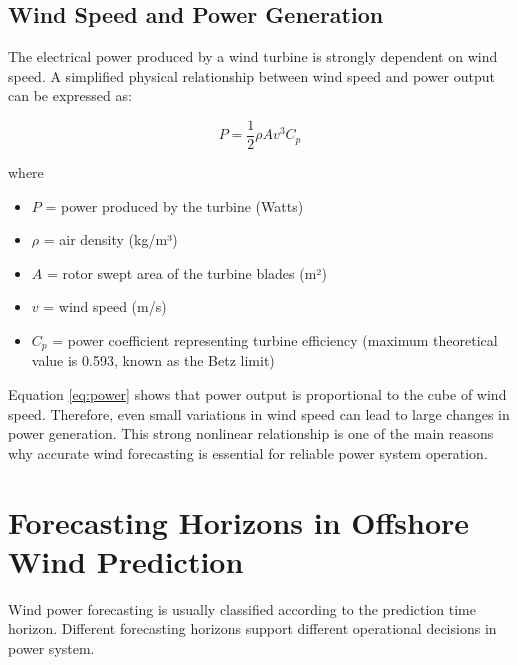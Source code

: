 \documentclass[12pt,a4paper]{article}
\begin{document}
\subsection{Wind Speed and Power Generation}

The electrical power produced by a wind turbine is strongly dependent on wind speed. A simplified physical relationship between wind speed and power output can be expressed as:

\begin{equation}
P = \frac{1}{2} \rho A v^3 C_p
\label{eq:power}
\end{equation}

where

\begin{itemize}
\item $P$ = power produced by the turbine (Watts)
\item $\rho$ = air density (kg/m³)
\item $A$ = rotor swept area of the turbine blades (m²)
\item $v$ = wind speed (m/s)
\item $C_p$ = power coefficient representing turbine efficiency (maximum theoretical value is 0.593, known as the Betz limit)
\end{itemize}

Equation \ref{eq:power} shows that power output is proportional to the cube of wind speed. Therefore, even small variations in wind speed can lead to large changes in power generation. This strong nonlinear relationship is one of the main reasons why accurate wind forecasting is essential for reliable power system operation.

\section{Forecasting Horizons in Offshore Wind Prediction}

Wind power forecasting is usually classified according to the prediction time horizon. Different forecasting horizons support different operational decisions in power system.
\end{document}
